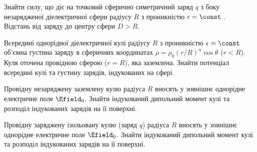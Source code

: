 \begin{problem}
Знайти силу, що діє на точковий сферично симетричний заряд  $q$ з боку незарядженої діелектричної сфери радіусу $R$  з проникністю $\epsilon = \const$ . Відстань від заряду до центру сфери $D > R$.
\end{problem}


\begin{problem}
    Всередині однорідної діелектричної кулі радіусу $R$ з проникністю $\epsilon=\const$  об'ємна густина заряду в сферичних координатах  $\rho = \rho_0(r/R)^n\cos\theta$ ($r<R$). Куля оточена провідною сферою ($r = R$), яка заземлена. Знайти потенціал всередині кулі та густину зарядів, індукованих на сфері.
\end{problem}

\begin{problem}
Провідну незаряджену заземлену кулю  радіуса $R$ вносять у зовнішнє однорідне електричне поле $\Efield_0$. Знайти індукований дипольний момент кулі  та розподіл індукованих зарядів на її поверхні.
\end{problem}

\begin{problem}
Провідну заряджену ізольовану кулю (заряд $q$) радіуса $R$ вносять у зовнішнє однорідне електричне поле $\Efield_0$. Знайти індукований дипольний момент кулі  та розподіл індукованих зарядів на її поверхні.
\end{problem}


